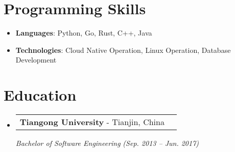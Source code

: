 \documentclass[letterpaper,11pt]{article}
\makeatletter
\newcommand{\resumeSubheading}[4]{
  \vspace{-1pt}\item
    \begin{tabular*}{0.97\textwidth}{l@{\extracolsep{\fill}}r}
      \textbf{#1} - #2 \\
    \end{tabular*}
    \jobTitle
        {#3} {#4}
}
\newcommand{\jobTitle}[2]{
    \textit{\small#1} \textit{\small(#2)} \\
}
\newcommand{\resumeSubHeadingListStart}{\begin{itemize}[leftmargin=*]}
\newcommand{\resumeSubHeadingListEnd}{\end{itemize}}
\makeatother
\begin{document}
%
\section{Programming Skills}
 \resumeSubHeadingListStart
   \item{
     \textbf{Languages}{: Python, Go, Rust, C++, Java}
   }
   \item{
     \textbf{Technologies}{: Cloud Native Operation, Linux Operation, Database Development }
   }
 \resumeSubHeadingListEnd
 

\section{Education}
  \resumeSubHeadingListStart
    \resumeSubheading
      {Tiangong University}{Tianjin, China}
      {Bachelor of Software Engineering}{Sep. 2013 -- Jun. 2017}
  \resumeSubHeadingListEnd


\end{document}
